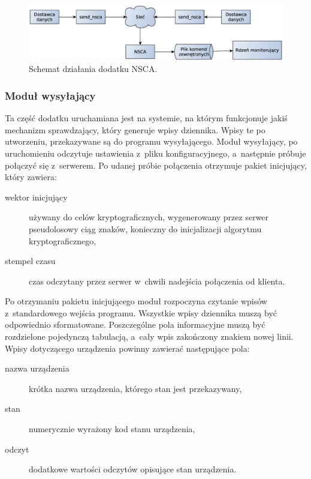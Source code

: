 \begin{figure}[h]
  \caption{Schemat działania dodatku NSCA.}
  \label{fig:nsca}
\includegraphics[width=1\textwidth]{img/nsca}
\end{figure}


\subsubsection[Moduł wysyłający][Moduł wysyłający]{Moduł wysyłający}
\label{subsubsec:modulWysylajacy}

Ta część dodatku uruchamiana jest na systemie, na którym funkcjonuje
jakiś mechanizm sprawdzający, który generuje wpisy dziennika. Wpisy te
po utworzeniu, przekazywane są do programu wysyłającego. Moduł
wysyłający, po uruchomieniu odczytuje ustawienia z~pliku
konfiguracyjnego, a~następnie próbuje połączyć się z~serwerem. Po
udanej próbie połączenia otrzymuje pakiet inicjujący, który zawiera:

\begin{description}
\item[wektor inicjujący] używany do celów kryptograficznych,
  wygenerowany przez serwer pseudolosowy ciąg znaków, konieczny do
  inicjalizacji algorytmu kryptograficznego,
\item[stempel czasu] czas odczytany przez serwer w~chwili nadejścia
  połączenia od klienta.
\end{description} 

Po otrzymaniu pakietu inicjującego moduł rozpoczyna czytanie wpisów
z~standardowego wejścia programu. Wszystkie wpisy dziennika muszą być
odpowiednio sformatowane. Poszczególne pola informacyjne muszą być
rozdzielone pojedynczą tabulacją, a~cały wpis zakończony znakiem
nowej linii. Wpisy dotyczącego urządzenia powinny zawierać następujące
pola:

\begin{description}
\item[nazwa urządzenia] krótka nazwa urządzenia, którego stan jest
  przekazywany,
\item[stan] numerycznie wyrażony kod stanu urządzenia,
\item[odczyt] dodatkowe wartości odczytów opisujące stan urządzenia.
\end{description}

